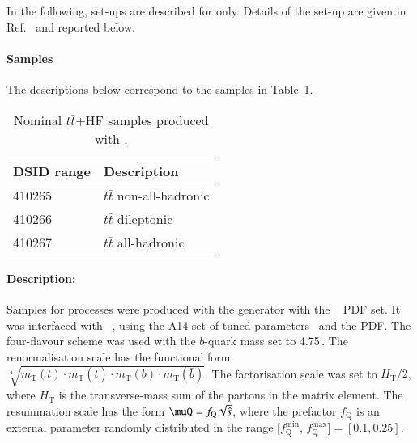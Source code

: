 \subsubsection[MadGraph5\_aMC@NLO+Pythia8]{\MGNLOPY[8]}
In the following, set-ups are described for \PYTHIA only. 
Details of the set-up are given in Ref.~\cite{ATL-PHYS-PUB-2016-016} and reported below. 

\paragraph{Samples}

The descriptions below correspond to the samples in Table~\ref{tab:ttHF_amc}.
\begin{table}[htbp]
\begin{center}
\caption{Nominal $t\bar{t}$+HF samples produced with \MGNLOPY[8]. } 
\label{tab:ttHF_amc}
\begin{tabular}{ l | l }
\hline
DSID range & Description \\
\hline
410265 & $t\bar{t}$ non-all-hadronic \\
410266 & $t\bar{t}$ dileptonic \\
410267 & $t\bar{t}$ all-hadronic \\
\hline
\end{tabular}
\end{center}
\end{table}

\paragraph{Description:}

Samples for \ttHF processes were produced with the \MGNLO generator 
with the \NNPDF[3.0nlo]~\cite{Ball:2014uwa} PDF set. It was interfaced with \PYTHIA[8.230]~\cite{Sjostrand:2014zea},
using the A14 set of tuned parameters~\cite{ATL-PHYS-PUB-2014-021} and the \NNPDF[2.3lo] PDF.
The four-flavour scheme was used with the $b$-quark mass set to 4.75\,\GeV.  
The renormalisation scale \muR has the functional form 
$\sqrt[4]{m_\text{T}(t) \cdot m_\text{T}(\bar{t}) \cdot m_\text{T}(b) \cdot m_\text{T}(\bar{b})}$. The 
factorisation scale \muF was set to $H_\text{T}/2$, where $H_\text{T}$ is the transverse-mass sum of the partons in the matrix
element.
The resummation scale \muQ has the form $\muQ = f_\text{Q} \sqrt{\hat{s}}$, where 
the prefactor $f_\text{Q}$ is an external parameter randomly distributed in the 
range $[f^\text{min}_\text{Q}$, $f^\text{max}_\text{Q}]=[0.1,0.25]$.    

